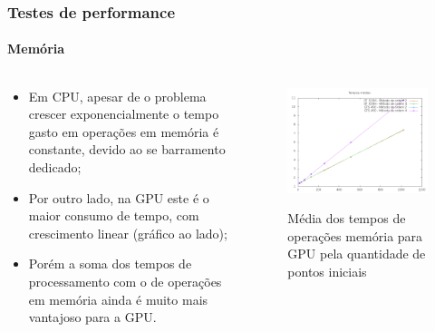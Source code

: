\documentclass[brazil, 10pt]{beamer}
\begin{document}
\begin{frame}
  \frametitle{Testes de performance}
  \framesubtitle{Memória}
  
  \begin{columns}
    \begin{column}{.5\textwidth}
      \begin{itemize}
        \item Em CPU, apesar de o problema crescer exponencialmente o tempo gasto em operações em memória é constante, devido ao se barramento dedicado;
        \item Por outro lado, na GPU este é o maior consumo de tempo, com crescimento linear (gráfico ao lado);
        \item Porém a soma dos tempos de processamento com o de operações em memória ainda é muito mais vantajoso para a GPU.
      \end{itemize}
    \end{column}
    \begin{column}{.5\textwidth}
      \begin{figure}[!h]
        \begin{center}
          \includegraphics[width=1.1\textwidth, height=.7\textwidth]{img/gpu-memo-means-double.png}
          \label{fig:cpu-means}
          \caption{Média dos tempos de operações memória para GPU pela quantidade de pontos iniciais}
        \end{center}
      \end{figure}
    \end{column}
  \end{columns}

\end{frame}
\end{document}
